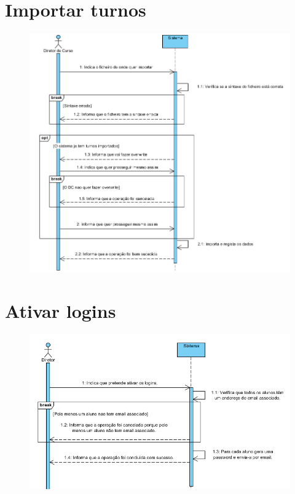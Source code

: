 \documentclass[12pt,a4paper]{report}
\begin{document}
\begin{appendices}
\section{Importar turnos}
\begin{figure}[H]
	\centering 
	\includegraphics[width=\textwidth]{modelacao/use_case_diagram/importarturnos.png}  
\end{figure}

\section{Ativar logins}
\begin{figure}[H]
	\centering 
	\includegraphics[width=\textwidth]{modelacao/use_case_diagram/ativarlogins.png}  
\end{figure}


\end{appendices}
\end{document}
